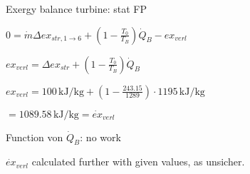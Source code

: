 Exergy balance turbine: stat FP  

\( 0 = \dot{m} \Delta ex_{str,1 \to 6} + \left( 1 - \frac{T_0}{T_B} \right) \dot{Q}_B - ex_{verl} \)  

\( ex_{verl} = \Delta ex_{str} + \left( 1 - \frac{T_0}{T_B} \right) \dot{Q}_B \)  

\( ex_{verl} = 100 \, \text{kJ/kg} + \left( 1 - \frac{243.15}{1289} \right) \cdot 1195 \, \text{kJ/kg} \)  

\( = 1089.58 \, \text{kJ/kg} = \dot{ex}_{verl} \)  

Function von \( \dot{Q}_B \): no work  

\( \dot{ex}_{verl} \) calculated further with given values, as unsicher.